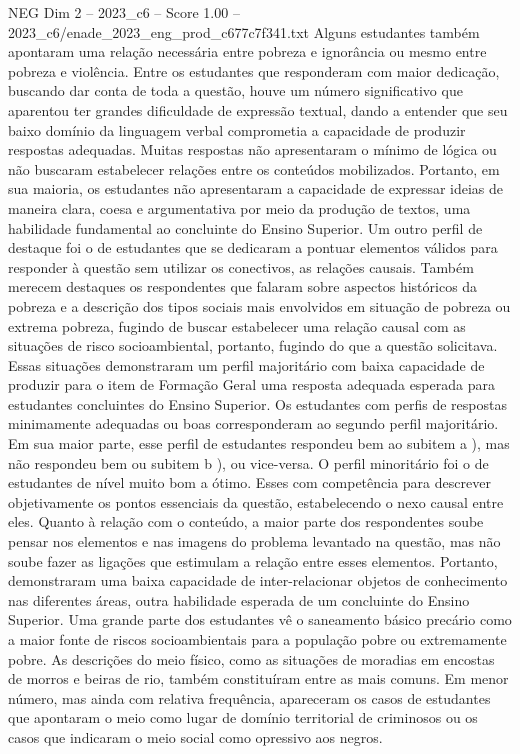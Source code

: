 \begin{textsample}{NEG Dim 2 – 2023\_c6 – Score 1.00 – 2023\_c6/enade\_2023\_eng\_prod\_c677c7f341.txt}
Alguns estudantes também apontaram uma relação necessária entre pobreza e ignorância ou mesmo entre pobreza e violência.
Entre os estudantes que responderam com maior dedicação, buscando dar conta de toda a questão, houve um número significativo que aparentou ter grandes dificuldade de expressão textual, dando a entender que seu baixo domínio da linguagem verbal comprometia a capacidade de produzir respostas adequadas.
Muitas respostas não apresentaram o mínimo de lógica ou não buscaram estabelecer relações entre os conteúdos mobilizados.
Portanto, em sua maioria, os estudantes não apresentaram a capacidade de expressar ideias de maneira clara, coesa e argumentativa por meio da produção de textos, uma habilidade fundamental ao concluinte do Ensino Superior.
Um outro perfil de destaque foi o de estudantes que se dedicaram a pontuar elementos válidos para responder à questão sem utilizar os conectivos, as relações causais.
Também merecem destaques os respondentes que falaram sobre aspectos históricos da pobreza e a descrição dos tipos sociais mais envolvidos em situação de pobreza ou extrema pobreza, fugindo de buscar estabelecer uma relação causal com as situações de risco socioambiental, portanto, fugindo do que a questão solicitava.
Essas situações demonstraram um perfil majoritário com baixa capacidade de produzir para o item de Formação Geral uma resposta adequada esperada para estudantes concluintes do Ensino Superior.
Os estudantes com perfis de respostas minimamente adequadas ou boas corresponderam ao segundo perfil majoritário.
Em sua maior parte, esse perfil de estudantes respondeu bem ao subitem a ), mas não respondeu bem ou subitem b ), ou vice-versa.
O perfil minoritário foi o de estudantes de nível muito bom a ótimo.
Esses com competência para descrever objetivamente os pontos essenciais da questão, estabelecendo o nexo causal entre eles.
Quanto à relação com o conteúdo, a maior parte dos respondentes soube pensar nos elementos e nas imagens do problema levantado na questão, mas não soube fazer as ligações que estimulam a relação entre esses elementos.
Portanto, demonstraram uma baixa capacidade de inter-relacionar objetos de conhecimento nas diferentes áreas, outra habilidade esperada de um concluinte do Ensino Superior.
Uma grande parte dos estudantes vê o saneamento básico precário como a maior fonte de riscos socioambientais para a população pobre ou extremamente pobre.
As descrições do meio físico, como as situações de moradias em encostas de morros e beiras de rio, também constituíram entre as mais comuns.
Em menor número, mas ainda com relativa frequência, apareceram os casos de estudantes que apontaram o meio como lugar de domínio territorial de criminosos ou os casos que indicaram o meio social como opressivo aos negros.

\end{textsample}
